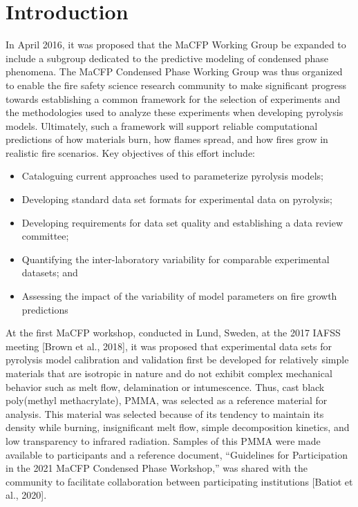 \documentclass{book}
\begin{document}
\newpage

\tableofcontents

\mainmatter

\pagestyle{plain}

\chapter{Introduction}

In April 2016, it was proposed that the MaCFP Working Group be expanded to include a subgroup dedicated to the predictive modeling of condensed phase phenomena. The MaCFP Condensed Phase Working Group was thus organized to enable the fire safety science research community to make significant progress towards establishing a common framework for the selection of experiments and the methodologies used to analyze these experiments when developing pyrolysis models. Ultimately, such a framework will support reliable computational predictions of how materials burn, how flames spread, and how fires grow in realistic fire scenarios. Key objectives of this effort include:
\begin{itemize}
 \item Cataloguing current approaches used to parameterize pyrolysis models;
 \item Developing standard data set formats for experimental data on pyrolysis;
 \item Developing requirements for data set quality and establishing a data review committee;
 \item Quantifying the inter-laboratory variability for comparable experimental datasets; and
 \item Assessing the impact of the variability of model parameters on fire growth predictions
\end{itemize}
At the first MaCFP workshop, conducted in Lund, Sweden, at the 2017 IAFSS meeting [Brown et al., 2018], it was proposed that experimental data sets for pyrolysis model calibration and validation first be developed for relatively simple materials that are isotropic in nature and do not exhibit complex mechanical behavior such as melt flow, delamination or intumescence. Thus, cast black poly(methyl methacrylate), PMMA, was selected as a reference material for analysis. This material was selected because of its tendency to maintain its density while burning, insignificant melt flow, simple decomposition kinetics, and low transparency to infrared radiation. Samples of this PMMA were made available to participants and a reference document, ``Guidelines for Participation in the 2021 MaCFP Condensed Phase Workshop,'' was shared with the community to facilitate collaboration between participating institutions [Batiot et al., 2020].
\end{document}
